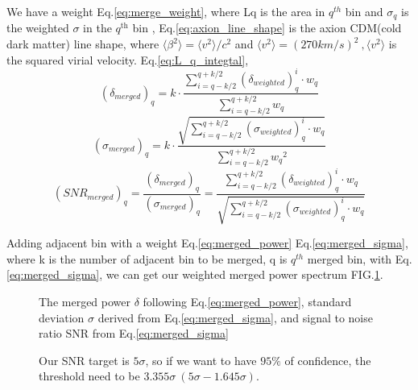 We have a weight Eq.\eqref{eq:merge_weight}, where Lq is the area in ${q^{th}}$ bin and $\sigma_{q}$ is the weighted $\sigma$ in the $q^{\mathrm{th}}$ bin , Eq.\eqref{eq:axion_line_shape} is the axion CDM(cold dark matter) line shape, where $\big \langle \beta^{2} \big \rangle = \big \langle v^{2} \big \rangle /c^{2}$ and $\big \langle v^{2} \big \rangle = (270km/s)^{2}\ , \big \langle v^{2} \big \rangle$ is the squared virial velocity. Eq.\eqref{eq:L_q_integtal}, 
\begin{equation}
    \label{eq:merged_power}
    (\delta_{merged})_q = k \cdot \frac{ \sum_{i = q-k/2}^{q+k/2}(\delta_{weighted})_{q}^{i} \cdot {w_{q}}}{\sum_{i = q-k/2}^{q+k/2} {w_{q}}}
\end{equation}
\begin{equation}
    \label{eq:merged_sigma}
    (\sigma_{merged})_q = k \cdot \frac{ \sqrt{\sum_{i = q-k/2}^{q+k/2} (\sigma_{weighted})_{q}^{i} \cdot {w_{q}}}}{\sum_{i = q-k/2}^{q+k/2} {w_{q}}^{2}}
\end{equation}
\begin{equation}
    \label{eq:merged_snr}
    ({SNR}_{merged})_q = \frac{(\delta_{merged})_q}{(\sigma_{merged})_q} = \frac{\sum_{i = q-k/2}^{q+k/2}(\delta_{weighted})_{q}^{i} \cdot {w_{q}}}{ \sqrt{\sum_{i = q-k/2}^{q+k/2} (\sigma_{weighted})_{q}^{i} \cdot {w_{q}}}}
\end{equation}

Adding adjacent bin with a weight Eq.\eqref{eq:merged_power} Eq.\eqref{eq:merged_sigma}, where k is the number of adjacent bin to be merged, q is ${q^{th}}$ merged bin, with Eq.\eqref{eq:merged_sigma}, we can get our weighted merged power spectrum FIG.\ref{fig:merged_data}.
\begin{figure}[h]
    \centering
    \caption{The merged power $\delta$ following Eq.\eqref{eq:merged_power}, standard deviation $\sigma$ derived from Eq.\eqref{eq:merged_sigma}, and signal to noise ratio SNR from Eq.\eqref{eq:merged_sigma}}
    \label{fig:merged_data}
\end{figure}

\begin{figure}[hbt!]
    \centering
    \caption{Our SNR target is $5\sigma$, so if we want to have $95\% $ of confidence, the threshold need to be $3.355\sigma \  (5\sigma - 1.645\sigma)$. }
    \label{fig:SNR_histogram}
\end{figure}


